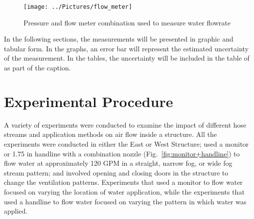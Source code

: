 \documentclass[12pt,oneside]{book}
\begin{document}
\begin{figure}[!ht]
\texttt{[image: ../Pictures/flow\_meter]}
\caption[Picture of Flowrate Meter]{Pressure and flow meter combination used to measure water flowrate}
\label{fig:flow_meter}
\end{figure}
\FloatBarrier

In the following sections, the measurements will be presented in graphic and tabular form. In the graphs, an error bar will represent the estimated uncertainty of the measurement. In the tables, the uncertainty will be included in the table of as part of the caption.

\section{Experimental Procedure}
\label{sec:exp_procedure}

A variety of experiments were conducted to examine the impact of different hose streams and application methods on air flow inside a structure. All the experiments were conducted in either the East or West Structure; used a monitor %
or 1.75 in handline with a combination nozzle (Fig.~\ref{fig:monitor+handline}) to flow water at approximately 120 GPM in a straight, narrow fog, or wide fog stream pattern; and involved opening and closing doors in the structure to change the ventilation patterns. Experiments that used a monitor to flow water focused on varying the location of water application, while the experiments that used a handline to flow water focused on varying the pattern in which water was applied.
\end{document}
